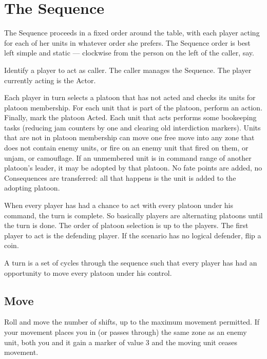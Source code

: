 \section{The Sequence}\label{sec:the-sequence}

The Sequence proceeds in a fixed order around the table, with each player acting for each of her units in whatever order she prefers. The Sequence order is best left simple and static --- clockwise from the person on the left of the caller, say.

Identify a player to act as caller. The caller manages the Sequence. The player currently acting is the Actor.

Each player in turn selects a platoon that has not acted and checks its units for platoon membership. For each unit that is part of the platoon, perform an action. Finally, mark the platoon Acted. Each unit that acts performs some bookeeping tasks (reducing jam counters by one and clearing old interdiction markers). Units that are not in platoon membership can move one free move into any zone that does not contain enemy units, or fire on an enemy unit that fired on them, or unjam, or camouflage. If an unmembered unit is in command range of another platoon's leader, it may be adopted by that platoon. No fate points are added, no Consequences are transferred: all that happens is the unit is added to the adopting platoon.

When every player has had a chance to act with every platoon under his command, the turn is complete. So basically players are alternating platoons until the turn is done. The order of platoon selection is up to the players. The first player to act is the defending player. If the scenario has no logical defender, flip a coin.

A turn is a set of cycles through the sequence such that every player has had an opportunity to move every platoon under his control.

\vfil

\subsection{Move}\label{sec:platoon-combat-move}



Roll  and move the number of shifts, up to the maximum movement permitted. If your movement places you in (or passes through) the same zone as an enemy unit, both you and it gain a \SPOTTED{} marker of value 3 and the moving unit ceases movement.

